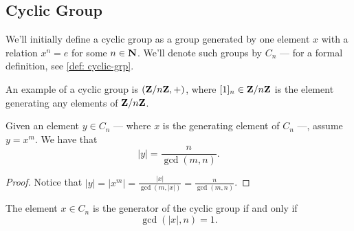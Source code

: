 \subsection{Cyclic Group}

We'll initially define a cyclic group as a group generated by one element \(x\)
with a relation \(x^n = e\) for some \(n \in \mathbf{N}\). We'll denote such groups by
\(C_n\) --- for a formal definition, see \cref{def: cyclic-grp}.

\begin{example}
An example of a cyclic group is \((\mathbf{Z}/n\mathbf{Z}, +)\), where \([1]_n \in \mathbf{Z}/n\mathbf{Z}\) is
the element generating any elements of \(\mathbf{Z}/n\mathbf{Z}\).
\end{example}

\begin{proposition}\label{prop: ord-cyclic-elem}
Given an element \(y \in C_n\) --- where \(x\) is the generating element of
\(C_n\) ---, assume \(y = x^m\). We have that
\[
  |y| = \frac n {\operatorname{gcd}(m, n)}.
\]
\end{proposition}

\begin{proof}
Notice that \(|y| = |x^m| = \frac{|x|}{\operatorname{gcd}(m, |x|)} = \frac n
{\operatorname{gcd}(m, n)}\).
\end{proof}

\begin{corollary}
The element \(x \in C_n\) is the generator of the cyclic group if and only if
\[
  \operatorname{gcd}(|x|, n) = 1.
\]
\end{corollary}
